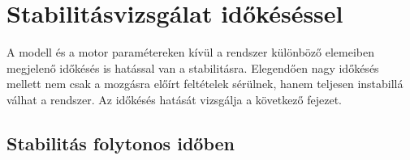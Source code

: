 \chapter{Stabilitásvizsgálat időkéséssel}\label{chap:time_delay_stability}

A modell és a motor paramétereken kívül a rendszer különböző elemeiben megjelenő időkésés 
is hatással van a stabilitásra. Elegendően nagy időkésés mellett nem csak a mozgásra előírt 
feltételek sérülnek, hanem teljesen instabillá válhat a rendszer. Az időkésés hatását vizsgálja
a következő fejezet.


\section{Stabilitás folytonos időben}

